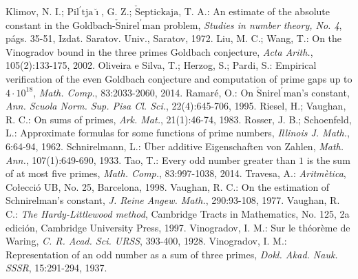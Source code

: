 \documentclass[11pt,a4paper,openright,oneside]{article}
\numberwithin{equation}{section}
\theoremstyle{definition}
\begin{document}
\begin{thebibliography}{25}
     Klimov, N. I.; $\text{Pil}^{\prime} \text{tja}\breve{\imath}$, G. Z.; $\check{\text{S}}\text{eptickaja}$, T. A.: An estimate of the absolute constant in the Goldbach-$\check{\text{S}}\text{nirel}^{\prime} \text{man}$ problem, \textit{Studies in number theory, No. 4}, p\'ags. 35-51, Izdat. Saratov. Univ., Saratov, 1972.
     Liu, M. C.; Wang, T.: On the Vinogradov bound in the three primes Goldbach conjecture, \textit{Acta Arith.}, 105(2):133-175, 2002.
     Oliveira e Silva, T.; Herzog, S.; Pardi, S.: Empirical verification of the even Goldbach conjecture and computation of prime gaps up to $4\cdot10^{18}$, \textit{Math. Comp.}, 83:2033-2060, 2014.
     Ramar\'e, O.: On $\check{\text{S}}\text{nirel}^{\prime} \text{man's}$ constant, \textit{Ann. Scuola Norm. Sup. Pisa Cl. Sci.}, 22(4):645-706, 1995.
     Riesel, H.; Vaughan, R. C.: On sums of primes, \textit{Ark. Mat.}, 21(1):46-74, 1983.
     Rosser, J. B.; Schoenfeld, L.: Approximate formulas for some functions of prime numbers, \textit{Illinois J. Math.}, 6:64-94, 1962.
     Schnirelmann, L.: \"Uber additive Eigenschaften von Zahlen, \textit{Math. Ann.}, 107(1):649-690, 1933.
     Tao, T.: Every odd number greater than $1$ is the sum of at most five primes, \textit{Math. Comp.}, 83:997-1038, 2014.
     Travesa, A.: \textit{Aritm\`etica}, Co{\l}ecci\'o UB, No. 25, Barcelona, 1998.
     Vaughan, R. C.: On the estimation of Schnirelman's constant, \textit{J. Reine Angew. Math.}, 290:93-108, 1977.
     Vaughan, R. C.: \textit{The Hardy-Littlewood method}, Cambridge Tracts in Mathematics, No. 125, 2a edici\'on, Cambridge University Press, 1997.
     Vinogradov, I. M.: Sur le th\'eor\`eme de Waring, \textit{C. R. Acad. Sci. URSS}, 393-400, 1928.
     Vinogradov, I. M.: Representation of an odd number as a sum of three primes, \textit{Dokl. Akad. Nauk. SSSR}, 15:291-294, 1937.
\end{thebibliography}
\end{document}
